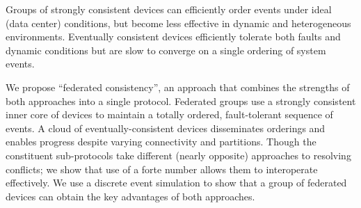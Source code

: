 Groups of strongly consistent devices can efficiently order events under
ideal (data center) conditions, but become less effective in dynamic and
heterogeneous environments.  Eventually consistent devices efficiently
tolerate both faults and dynamic conditions but are slow to converge on a
single ordering of system events.

We propose ``federated consistency'', an approach that combines the strengths
of both approaches into a single protocol.  Federated groups use a strongly
consistent inner core of devices to maintain a totally ordered, fault-tolerant
sequence of events.  A cloud of eventually-consistent devices disseminates
orderings and enables progress despite varying connectivity and partitions.
Though the constituent sub-protocols take different (nearly opposite)
approaches to resolving conflicts; we show that use of a forte number allows
them to interoperate effectively.  We use a discrete event simulation to show
that a group of federated devices can obtain the key advantages of both
approaches.
